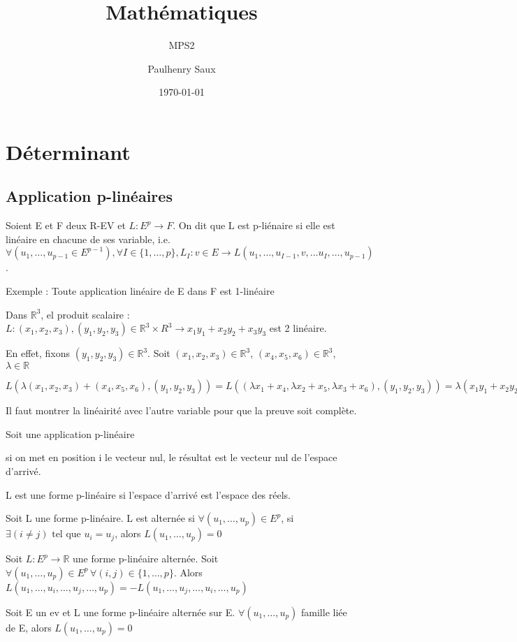 \documentclass[french]{yLectureNote}
\title{Mathématiques}
\subtitle{MPS2}
\author{Paulhenry Saux}
\date{\today}
\newcommand{\R}[0]{\mathbb{R}}
\newcommand{\tq}[0]{\text{ tel que }}
\begin{document}
\setcounter{chapter}{7}
\chapter{Déterminant}
\section{Application p-linéaires}
\begin{definition}
Soient E et F deux R-EV et \(L:E^p\to F\). On dit que L est p-liénaire si elle est linéaire en chacune de ses variable, i.e. \(\forall (u_1,\dots, u_{p-1}\in E^{p-1}), \forall I\in \{1,\dots, p\}, L_I : v\in E \to L(u_1,\dots, u_{I-1},v,\dots u_I,\dots, u_{p-1})\).
\end{definition}
Exemple : Toute application linéaire de E dans F est 1-linéaire

Dans \(\R^3\), el produit scalaire : \(L : (x_1,x_2,x_3),(y_1,y_2,y_3)\in \R^3\times R^3 \to x_1y_1+x_2y_2+x_3y_3\) est 2 linéaire.

En effet, fixons \((y_1,y_2,y_3)\in \R^3\). Soit \((x_1,x_2,x_3)\in \R^3\), \((x_4,x_5,x_6)\in \R^3\), \(\lambda\in \R\)

\(L(\lambda(x_1,x_2,x_3) + (x_4,x_5,x_6), (y_1,y_2,y_3)) = L((\lambda x_1+x_4, \lambda x_2+x_5, \lambda x_3+x_6), (y_1,y_2,y_3)) = \lambda (x_1y_1+x_2y_2+x_3y_3)+(x_4y_1+x_5y_2+x_6y_3) = \lambda L() + L()\)

Il faut montrer la linéairité avec l'autre variable pour que la preuve soit complète.
\begin{proposition}
Soit une application p-linéaire

si on met en position i le vecteur nul, le résultat est le vecteur nul de l'espace d'arrivé.
\end{proposition}
\begin{definition}
L est une forme p-linéaire si l'espace d'arrivé est l'espace des réels.
\end{definition}
\begin{definition}
Soit L une forme p-linéaire. L est alternée si \(\forall (u_1,\dots, u_p)\in E^p\), si \(\exists (i\neq j)\tq u_i = u_j\), alors \(L(u_1,\dots, u_p) = 0\)
\end{definition}
\begin{proposition}
Soit \(L : E^p \to \R\) une forme p-linéaire alternée. Soit \(\forall (u_1,\dots, u_p)\in E^p\, \forall (i,j)\in \{1,\dots, p\}\). Alors \(L(u_1,\dots, u_i,\dots, u_j,\dots, u_p) = - L(u_1,\dots, u_j,\dots, u_i,\dots, u_p)\)
\end{proposition}
\begin{proposition}
Soit E un ev et L une forme p-linéaire alternée sur E. \(\forall (u_1,\dots, u_p)\) famille liée de E, alors \(L(u_1,\dots, u_p) = 0\)
\end{proposition}
\end{document}
